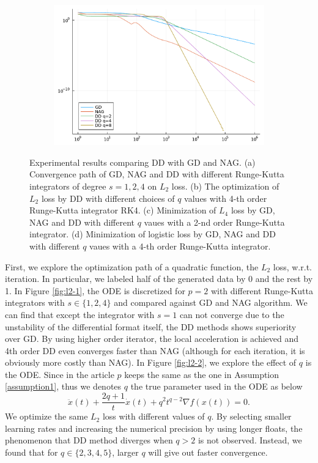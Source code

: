 \begin{figure}[htbp]
\begin{subfigure}{0.45\textwidth}
        \caption{}
        \label{l4}
    \end{subfigure}
    \hfill
    \begin{subfigure}{0.45\textwidth}
        \includegraphics[width=\textwidth]{"assets/logistic.pdf"}
        \caption{}
        \label{fig:logistic}
    \end{subfigure}
    \caption{Experimental results comparing DD with GD and NAG. (a) Convergence path of GD, NAG and DD with different Runge-Kutta integrators of degree $s=1, 2, 4$ on $L_2$ loss. (b) The optimization of $L_2$ loss by DD with different choices of $q$ values with 4-th order Runge-Kutta integrator RK4. (c) Minimization of $L_4$ loss by GD, NAG and DD with different $q$ vaues with a 2-nd order Runge-Kutta integrator. (d) Minimization of logistic loss by GD, NAG and DD with different $q$ vaues with a 4-th order Runge-Kutta integrator.}
    \label{Numerical}
\end{figure}

First, we explore the optimization path of a quadratic function, the $L_2$ loss, w.r.t. iteration. In particular, we labeled half of the generated data by 0 and the rest by 1. In Figure \ref{fig:l2-1}, the ODE is discretized for $p=2$ with different Runge-Kutta integrators with $s \in \{ 1,2,4 \}$ and compared against GD and NAG algorithm. We can find that except the integrator with $s=1$ can not converge due to the unstability of the differential format itself, the DD methods shows superiority over GD. By using higher order iterator, the local acceleration is achieved and 4th order DD even converges faster than NAG (although for each iteration, it is obviously more costly than NAG). In Figure \ref{fig:l2-2}, we explore the effect of $q$ is the ODE. Since in the article $p$ keeps the same as the one in Assumption \ref{assumption1}, thus we denotes $q$ the true parameter used in the ODE as below
$$
    \ddot x(t) + \frac{2q+1}{t}\dot x(t)+q^2 t^{q-2}\nabla  f(x(t)) = 0.
$$
We optimize the same $L_2$ loss with different values of $q$. By selecting smaller learning rates and increasing the numerical precision by using longer floats, the phenomenon that DD method diverges when $q>2$ is not observed. Instead, we found that for $q \in \{ 2,3,4,5 \}$, larger $q$ will give out faster convergence.

